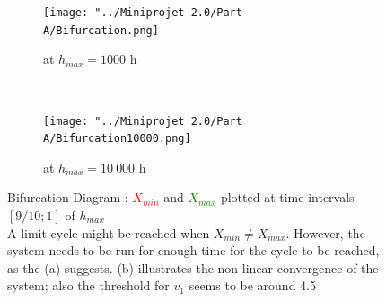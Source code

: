 \documentclass[10pt,a4paper,oneside,twocolumn]{article}
\newcommand{\red}[1]{\textcolor{red}{#1}}
\newcommand{\green}[1]{\textcolor{green}{#1}}
\numberwithin{equation}{section} %
\begin{document}
    \begin{figure}
	\centering
	    \begin{subfigure}[b]{0.43\textwidth}
		\texttt{[image: "../Miniprojet 2.0/Part A/Bifurcation.png]}
		\caption{at $h_{max}=1000$ h}
	    \end{subfigure}
	     ~ 
	    \begin{subfigure}[b]{0.43\textwidth}
		\texttt{[image: "../Miniprojet 2.0/Part A/Bifurcation10000.png]}
		\caption{at $h_{max}=10~000$ h}
	    \end{subfigure}
	    \caption{Bifurcation Diagram : \red{$X_{min}$} and \green{$X_{max}$} plotted at time intervals $[9/10; 1]$ of $h_{max}$ \\
	    A limit cycle might be reached when $X_{min} \neq X_{max}$. However, the system needs to be run for enough time for the cycle to be reached, as the (a) suggests. (b) illustrates the non-linear convergence of the system; also the threshold for $v_1$ seems to be around 4.5}
    \end{figure}
\end{document}
